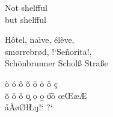 \documentclass[a4paper, 11pt]{article}
\begin{document}

\Large Not shelfful\\
but shelf\mbox{}ful
\newline



H\^otel, na\"\i ve, \'el\`eve,\\
sm\o rrebr\o d, !`Se\~norita!,\\
Sch\"onbrunner Schol\ss{}
Stra\ss e
\newline


\`o \'o \^o \~o 
\=o \.o \"o \c c\\
\u o \v o \H o \c o
\d o \b o \t oo
\oe \OE \ae \AE\\
\aa \AA \o \O \l \L \i \j !` ?`
\end{document}
